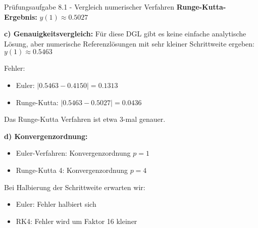 \begin{example2}{Prüfungsaufgabe 8.1 - Vergleich numerischer Verfahren}
\textbf{Runge-Kutta-Ergebnis:} $y(1) \approx 0.5027$

\textbf{c) Genauigkeitsvergleich:}
Für diese DGL gibt es keine einfache analytische Lösung, aber numerische Referenzlösungen mit sehr kleiner Schrittweite ergeben: $y(1) \approx 0.5463$

Fehler:
\begin{itemize}
    \item Euler: $|0.5463 - 0.4150| = 0.1313$
    \item Runge-Kutta: $|0.5463 - 0.5027| = 0.0436$
\end{itemize}

Das Runge-Kutta Verfahren ist etwa 3-mal genauer.

\textbf{d) Konvergenzordnung:}
\begin{itemize}
    \item Euler-Verfahren: Konvergenzordnung $p = 1$
    \item Runge-Kutta 4: Konvergenzordnung $p = 4$
\end{itemize}

Bei Halbierung der Schrittweite erwarten wir:
\begin{itemize}
    \item Euler: Fehler halbiert sich
    \item RK4: Fehler wird um Faktor 16 kleiner
\end{itemize}
\end{example2}

